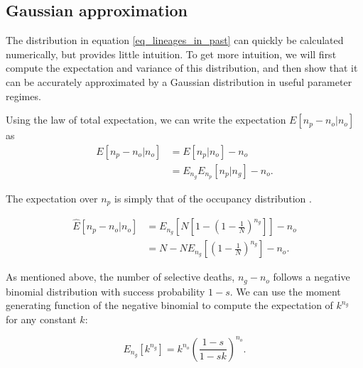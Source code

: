 \documentclass[review]{elsarticle}
\newcommand{\sgcomment}[1]{{\color{red}{SG: #1}}}
\begin{document}
\subsection{Gaussian approximation}
\label{subsec_gaussian}

The distribution in equation \ref{eq_lineages_in_past} can quickly be calculated numerically, but
provides little intuition. To get more intuition, we will first compute the
expectation and variance of this distribution, and then show that it can be accurately approximated by a
Gaussian distribution in useful parameter regimes.

Using the law of total expectation, we can write the expectation $E[n_p-n_o | n_o]$ as 
\begin{equation*}
  \begin{aligned}
    \label{eq_lineages_approx}
    E[n_p-n_o | n_o] &=        E[n_p | n_o]       - n_o \\
                     &=E_{n_g} E_{n_p}[n_p | n_g] - n_o.
  \end{aligned}
\end{equation*}

The expectation over $n_p$ is simply that of the occupancy distribution \cite{Wakeley2009}.

\begin{equation*}
  \begin{aligned}
    \label{eq_lineages_derive}
    \hat{E}[n_p -n_o | n_o]
    & =   E_{n_g}\left[N\left[1-\left(1 - \frac{1}{N} \right)^{n_g} \right]\right]- n_o\\
    & =   N-N  E_{n_g}\left[\left(1 - \frac{1}{N} \right)^{n_g} \right] -n_o. 
  \end{aligned}
\end{equation*}

As mentioned above, the number of selective deaths, $n_g-n_o$ follows a negative binomial
distribution with success probability $1-s$. We can use the moment generating function of the negative binomial to compute the
expectation of $k^{n_g}$ for any constant $k$:

\begin{equation}
  E_{n_g}[k^{n_g}] = k^{n_o}  \left(\frac{1-s}{1-sk}\right)^{n_o}.
  \label{eq_identity}
\end{equation} 
\end{document}

